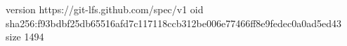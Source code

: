 version https://git-lfs.github.com/spec/v1
oid sha256:f93bdbf25db65516afd7c117118ccb312be006e77466ff8e9fedec0a0ad5ed43
size 1494
